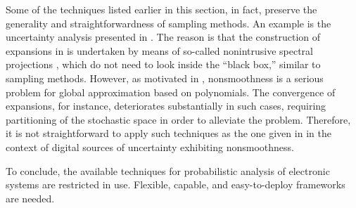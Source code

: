 Some of the techniques listed earlier in this section, in fact, preserve the
generality and straightforwardness of sampling methods. An example is the
uncertainty analysis presented in \cite{ukhov2015}. The reason is that the
construction of  expansions in \cite{ukhov2015} is undertaken by means of
so-called nonintrusive spectral projections \cite{xiu2010}, which do not need to
look inside the ``black box,'' similar to sampling methods. However, as
motivated in , nonsmoothness is a serious problem for global
approximation based on polynomials. The convergence of  expansions, for
instance, deteriorates substantially in such cases, requiring partitioning of
the stochastic space in order to alleviate the problem. Therefore, it is not
straightforward to apply such techniques as the one given in \cite{ukhov2015} in
the context of digital sources of uncertainty exhibiting nonsmoothness.

To conclude, the available techniques for probabilistic analysis of electronic
systems are restricted in use. Flexible, capable, and easy-to-deploy frameworks
are needed.
